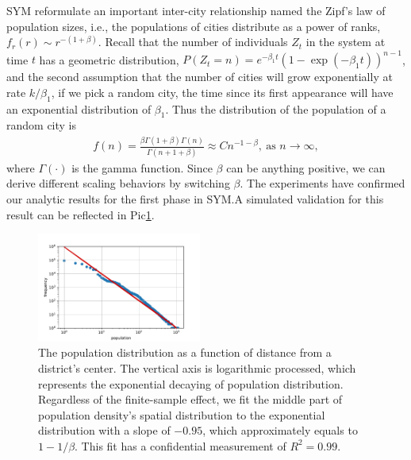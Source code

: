 \documentclass[reprint,unsortedaddress,amsmath,amssymb,floatfix,aps,prl,showkeys]{revtex4-2}
\begin{document}
SYM reformulate an important inter-city relationship named the Zipf's law of population sizes\cite{gabaix1999zipf's}, i.e., the populations of cities distribute as a power of ranks, $f_r(r)\sim r^{-(1+\beta)}$. Recall that the number of individuals $Z_t$ in the system at time $t$ has a geometric distribution\cite{durrett1999essentials}, $P(Z_t=n)=e^{-\beta_1t}(1-\exp(- {\beta_1} t))^{n-1}$, and the second assumption that the number of cities will grow exponentially at rate $k/\beta_1$, if we pick a random city, the time since its first appearance will have an exponential distribution of $\beta_1$. Thus the distribution of the population of a random city is 
\begin{align}
	f(n)=\frac{\beta\Gamma(1+\beta)\Gamma(n)}{\Gamma(n+1+\beta)}\approx Cn^{-1-\beta}, \ \text{as } n\rightarrow\infty,
\end{align}
where $\Gamma(\cdot)$ is the gamma function. Since $\beta$ can be anything positive, we can derive different scaling behaviors by switching $\beta$. The experiments have confirmed our analytic results for the first phase in SYM.\@ A simulated validation for this result can be reflected in Pic\@\ref{fig:rankditribution}. 
\begin{figure}[t]
    \centering
    \includegraphics[width=0.48\textwidth]{pics/zipf.pdf}
    \caption{The population distribution as a function of distance from a district's center. The vertical axis is logarithmic processed, which represents the exponential decaying of population distribution. Regardless of the finite-sample effect, we fit the middle part of population density's spatial distribution to the exponential distribution with a slope of $-0.95$, which approximately equals to $1-1/\beta$. This fit has a confidential measurement of $R^2=0.99$.}
    \label{fig:rankditribution}
\end{figure}




\end{document}
